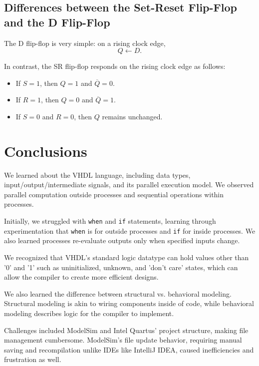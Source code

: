 \documentclass[12pt]{article}
\begin{document}
\subsection{Differences between the Set-Reset Flip-Flop and the D Flip-Flop}
The D flip-flop is very simple: on a rising clock edge, 
\[
Q \gets D.
\]

In contrast, the SR flip-flop responds on the rising clock edge as follows:
\begin{itemize}
    \item If \( S = 1 \), then \( Q = 1 \) and \( \overline{Q} = 0 \).
    \item If \( R = 1 \), then \( Q = 0 \) and \( \overline{Q} = 1 \).
    \item If \( S = 0 \) and \( R = 0 \), then \( Q \) remains unchanged.
\end{itemize}
\section{Conclusions}


We learned about the VHDL language, including data types, input/output/intermediate signals, and its parallel execution model. We observed parallel computation outside processes and sequential operations within processes.

Initially, we struggled with \texttt{when} and \texttt{if} statements, learning through experimentation that \texttt{when} is for outside processes and \texttt{if} for inside processes.  We also learned processes re-evaluate outputs only when specified inputs change.

We recognized that VHDL's standard logic datatype can hold values other than '0' and '1' such as uninitialized, unknown, and 'don't care' states, which can allow the compiler to create more efficient designs.

We also learned the difference between structural vs. behavioral modeling. Structural modeling is akin to wiring components inside of code, while behavioral modeling describes logic for the compiler to implement.

Challenges included ModelSim and Intel Quartus' project structure, making file management cumbersome. ModelSim's file update behavior, requiring manual saving and recompilation unlike IDEs like IntelliJ IDEA, caused inefficiencies and frustration as well.
\end{document}
